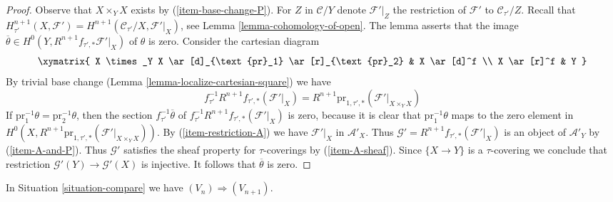 \begin{proof}
Observe that $X \times_Y X$ exists by (\ref{item-base-change-P}).
For $Z$ in $\mathcal{C}/Y$ denote $\mathcal{F}'|_Z$
the restriction of $\mathcal{F}'$ to $\mathcal{C}_{\tau'}/Z$.
Recall that $H^{n + 1}_{\tau'}(X, \mathcal{F}') =
H^{n + 1}(\mathcal{C}_{\tau'}/X, \mathcal{F}'|_X)$, see
Lemma \ref{lemma-cohomology-of-open}.
The lemma asserts that the
image $\overline{\theta} \in H^0(Y, R^{n + 1}f_{\tau', *}\mathcal{F}'|_X)$
of $\theta$ is zero. Consider the cartesian diagram
$$
\xymatrix{
X \times_Y X \ar[d]_{\text{pr}_1} \ar[r]_{\text{pr}_2} &
X \ar[d]^f \\
X \ar[r]^f & Y
}
$$
By trivial base change (Lemma \ref{lemma-localize-cartesian-square})
we have
$$
f_{\tau'}^{-1}R^{n + 1}f_{\tau', *}(\mathcal{F}'|_X) =
R^{n + 1}\text{pr}_{1, \tau', *}(\mathcal{F}'|_{X \times_Y X})
$$
If $\text{pr}_1^{-1}\theta = \text{pr}_2^{-1}\theta$,
then the section $f_{\tau'}^{-1}\overline{\theta}$ of
$f_{\tau'}^{-1}R^{n + 1}f_{\tau', *}(\mathcal{F}'|_X)$ is zero,
because it is clear that $\text{pr}_1^{-1}\theta$ maps to the zero element in
$H^0(X, R^{n + 1}\text{pr}_{1, \tau', *}(\mathcal{F}'|_{X \times_Y X}))$.
By (\ref{item-restriction-A}) we have $\mathcal{F}'|_X$ in $\mathcal{A}'_X$.
Thus $\mathcal{G}' = R^{n + 1}f_{\tau', *}(\mathcal{F}'|_X)$
is an object of $\mathcal{A}'_Y$ by (\ref{item-A-and-P}).
Thus $\mathcal{G}'$ satisfies the sheaf property for
$\tau$-coverings by (\ref{item-A-sheaf}).
Since $\{X \to Y\}$ is a $\tau$-covering we conclude
that restriction $\mathcal{G}'(Y) \to \mathcal{G}'(X)$ is injective.
It follows that $\overline{\theta}$ is zero.
\end{proof}

\begin{lemma}
\label{lemma-induction-step-V-C-general}
In Situation \ref{situation-compare} we have $(V_n) \Rightarrow (V_{n + 1})$.
\end{lemma}

